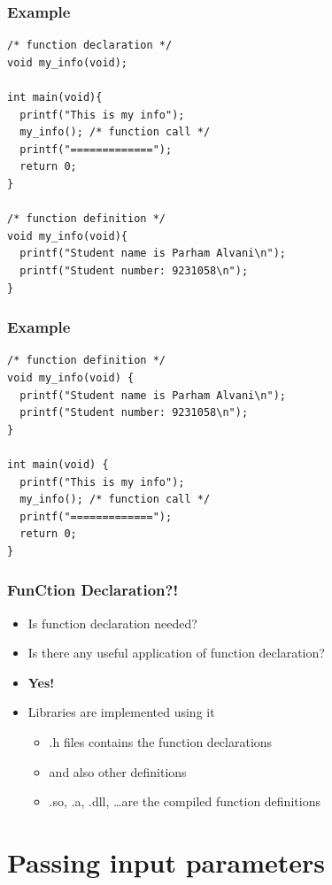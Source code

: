 \documentclass{../c-lecture}
\begin{document}
\begin{frame}[fragile]
  \frametitle{Example}
  \scriptsize
  \begin{verbatim}
/* function declaration */
void my_info(void);

int main(void){
  printf("This is my info");
  my_info(); /* function call */
  printf("=============");
  return 0;
}

/* function definition */
void my_info(void){
  printf("Student name is Parham Alvani\n");
  printf("Student number: 9231058\n");
}
  \end{verbatim}
\end{frame}

\begin{frame}[fragile]
  \frametitle{Example}
  \scriptsize
  \begin{verbatim}
/* function definition */
void my_info(void) {
  printf("Student name is Parham Alvani\n");
  printf("Student number: 9231058\n");
}

int main(void) {
  printf("This is my info");
  my_info(); /* function call */
  printf("=============");
  return 0;
}
  \end{verbatim}
\end{frame}

\begin{frame}
  \frametitle{FunCtion Declaration?!}
  \begin{itemize}
    \item Is function declaration needed?
    \item Is there any useful application of function declaration?
    \item \textbf{\color{Orange} Yes!}
    \item Libraries are implemented using it
    \begin{itemize}
      \item .h files contains the function declarations
      \item and also other definitions
      \item .so, .a, .dll, \ldots are the compiled function definitions
    \end{itemize}
  \end{itemize}
\end{frame}

\section{Passing input parameters}
\end{document}
